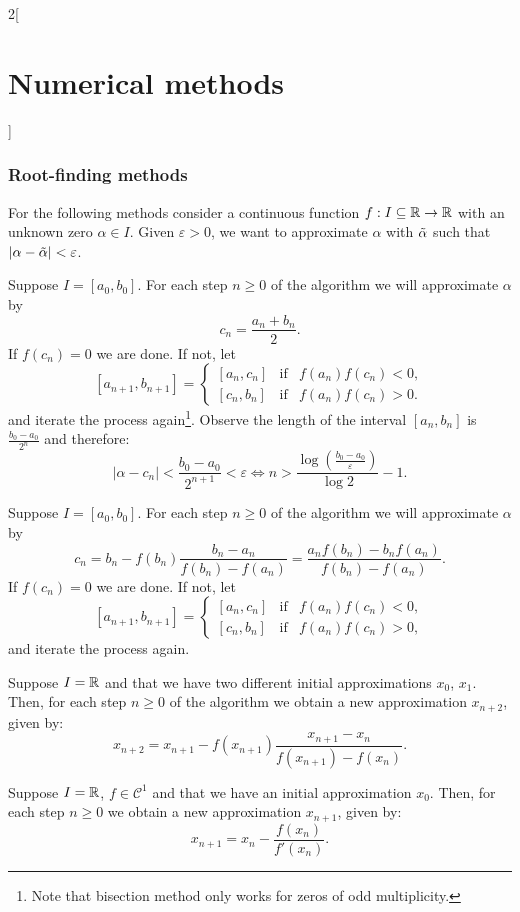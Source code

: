 \documentclass[../../../main.tex]{subfiles}
\begin{document}
\begin{multicols}{2}[\section{Numerical methods}]
\subsubsection*{Root-finding methods}
    For the following methods consider a continuous function $f:I\subseteq\mathbb{R}\rightarrow\mathbb{R}$ with an unknown zero $\alpha\in I$. Given $\varepsilon>0$, we want to approximate $\alpha$ with $\Tilde{\alpha}$ such that $|\alpha-\Tilde{\alpha}|<\varepsilon$.
\begin{method}
    Suppose $I=[a_0,b_0]$. For each step $n\geq 0$ of the algorithm we will approximate $\alpha$ by $$c_n=\frac{a_n+b_n}{2}.$$ If $f(c_n)=0$ we are done. If not, let 
    $$[a_{n+1},b_{n+1}]=\left\{
    \begin{array}{ccc}
        [a_n,c_n] & \text{if} & f(a_n)f(c_n)<0, \\
        \left[c_n,b_n\right] & \text{if} & f(a_n)f(c_n)>0.
    \end{array}\right.$$ 
    and iterate the process again\footnote{Note that bisection method only works for zeros of odd multiplicity.}. Observe the length of the interval $[a_n,b_n]$ is $\frac{b_0-a_0}{2^n}$ and therefore: $$|\alpha-c_n|<\frac{b_0-a_0}{2^{n+1}}<\varepsilon\iff n>\frac{\log\left(\frac{b_0-a_0}{\varepsilon}\right)}{\log 2}-1.$$
\end{method}
\begin{method}
    Suppose $I=[a_0,b_0]$. For each step $n\geq 0$ of the algorithm we will approximate $\alpha$ by $$c_n=b_n-f(b_n)\frac{b_n-a_n}{f(b_n)-f(a_n)}=\frac{a_nf(b_n)-b_nf(a_n)}{f(b_n)-f(a_n)}.$$ If $f(c_n)=0$ we are done. If not, let
    $$[a_{n+1},b_{n+1}]=\left\{
    \begin{array}{ccc}
        [a_n,c_n] & \text{if} & f(a_n)f(c_n)<0, \\
        \left[c_n,b_n\right] & \text{if} & f(a_n)f(c_n)>0,
    \end{array}\right.$$ 
    and iterate the process again.
\end{method}
\begin{method}
    Suppose $I=\mathbb{R}$ and that we have two different initial approximations $x_0$, $x_1$. Then, for each step $n\geq 0$ of the algorithm we obtain a new approximation $x_{n+2}$, given by: $$x_{n+2}=x_{n+1}-f(x_{n+1})\frac{x_{n+1}-x_n}{f(x_{n+1})-f(x_n)}.$$
\end{method}
\begin{method}
    Suppose $I=\mathbb{R}$, $f\in\mathcal{C}^1$ and that we have an initial approximation $x_0$. Then, for each step $n\geq 0$ we obtain a new approximation $x_{n+1}$, given by: $$x_{n+1}=x_n-\frac{f(x_n)}{f'(x_n)}.$$

\end{method}
\end{multicols}
\end{document}
